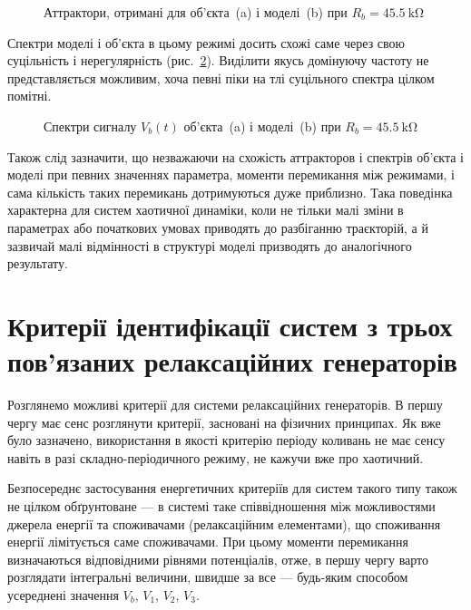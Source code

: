 \begin{figure}[htb!]
  \caption{Аттрактори, отримані для об'єкта~(a) і моделі~(b) при $ R_b = \SI{45.5}{\kilo \ohm} $}
  \label{atu:f:relax3d_mo_v1v2v3m_17}
\end{figure}


Спектри моделі і об'єкта в цьому режимі досить схожі саме через
свою суцільність і нерегулярність (рис.~\ref{atu:f:relax3d_mo_f_17}). Виділити
якусь домінуючу частоту не представляється можливим, хоча
певні піки на тлі суцільного спектра цілком помітні.

\begin{figure}[htb!]
  \caption{Спектри сигналу $V_b(t) $ об'єкта~(a) і моделі~(b) при $ R_b = \SI{45.5}{\kilo \ohm} $}
\label{atu:f:relax3d_mo_f_17}
\end{figure}

Також слід зазначити, що незважаючи на схожість аттракторов
і спектрів об'єкта і моделі при певних значеннях параметра,
моменти перемикання між режимами, і сама кількість таких
перемикань дотримуються дуже приблизно. Така поведінка
характерна для систем хаотичної динаміки, коли не тільки
малі зміни в параметрах або початкових умовах приводять до
разбіганню траєкторій, а й зазвичай малі відмінності в
структурі моделі призводять до аналогічного результату.



\section{Критерії ідентифікації систем з трьох пов'язаних релаксаційних генераторів}

Розглянемо можливі критерії для системи релаксаційних
генераторів. В першу чергу має сенс розглянути критерії,
засновані на фізичних принципах. Як вже було зазначено,
використання в якості критерію періоду коливань не
має сенсу навіть в разі складно-періодичного режиму, не
кажучи вже про хаотичний.

Безпосереднє застосування енергетичних критеріїв для систем
такого типу також не цілком обґрунтоване --- в системі таке
співвідношення між можливостями джерела енергії та споживачами
(релаксаційним елементами), що споживання енергії лімітується
саме споживачами. При цьому моменти перемикання визначаються
відповідними рівнями потенціалів, отже, в першу чергу варто
розглядати інтегральні величини, швидше за все --- будь-яким
способом усереднені значення
$V_b$,
$V_1$,
$V_2$,
$V_3$.

